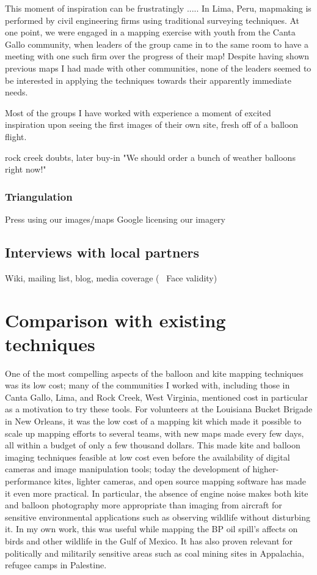\documentclass[11pt]{report}
\begin{document}
This moment of inspiration can be frustratingly ..... In Lima, Peru, mapmaking is performed by civil engineering firms using traditional surveying techniques. At one point, we were engaged in a mapping exercise with youth from the Canta Gallo community, when leaders of the group came in to the same room to have a meeting with one such firm over the progress of their map! Despite having shown previous maps I had made with other communities, none of the leaders seemed to be interested in applying the techniques towards their apparently immediate needs.  

Most of the groups I have worked with experience a moment of excited inspiration upon seeing the first images of their own site, fresh off of a balloon flight. 

rock creek doubts, later buy-in "We should order a bunch of weather balloons right now!"

\subsubsection{Triangulation}

Press using our images/maps
Google licensing our imagery

\subsection{Interviews with local partners}
Wiki, mailing list, blog, media coverage (~ Face validity)

\section{Comparison with existing techniques}


One of the most compelling aspects of the balloon and kite mapping techniques was its low cost; many of the communities I worked with, including those in Canta Gallo, Lima, and Rock Creek, West Virginia, mentioned cost in particular as a motivation to try these tools. For volunteers at the Louisiana Bucket Brigade in New Orleans, it was the low cost of a mapping kit which made it possible to scale up mapping efforts to several teams, with new maps made every few days, all within a budget of only a few thousand dollars. This made kite and balloon imaging techniques feasible at low cost even before the availability of digital cameras and image manipulation tools; today the development of higher-performance kites, lighter cameras, and open source mapping software has made it even more practical. In particular, the absence of engine noise makes both kite and balloon photography more appropriate than imaging from aircraft for sensitive environmental applications such as observing wildlife without disturbing it. \cite{aber1999kite} In my own work, this was useful while mapping the BP oil spill's affects on birds and other wildlife in the Gulf of Mexico. It has also proven relevant for politically and militarily sensitive areas such as coal mining sites in Appalachia, refugee camps in Palestine.
\end{document}
